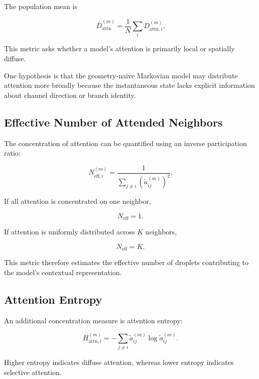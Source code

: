 \documentclass[11pt]{article}
\begin{document}
The population mean is

\begin{equation}
\bar{D}_{\mathrm{attn}}^{(m)}
=
\frac{1}{N}
\sum_i
D_{\mathrm{attn},i}^{(m)}.
\end{equation}

This metric asks whether a model's attention is primarily local or spatially diffuse.

One hypothesis is that the geometry-naive Markovian model may distribute attention more broadly because the instantaneous state lacks explicit information about channel direction or branch identity.

\subsection{Effective Number of Attended Neighbors}

The concentration of attention can be quantified using an inverse participation ratio:

\begin{equation}
N_{\mathrm{eff},i}^{(m)}
=
\frac{
1
}{
\sum_{j\neq i}
\left(
\tilde{a}_{ij}^{(m)}
\right)^2
}.
\end{equation}

If all attention is concentrated on one neighbor,

\begin{equation}
N_{\mathrm{eff}}=1.
\end{equation}

If attention is uniformly distributed across \(K\) neighbors,

\begin{equation}
N_{\mathrm{eff}}=K.
\end{equation}

This metric therefore estimates the effective number of droplets contributing to the model's contextual representation.

\subsection{Attention Entropy}

An additional concentration measure is attention entropy:

\begin{equation}
H_{\mathrm{attn},i}^{(m)}
=
-
\sum_{j\neq i}
\tilde{a}_{ij}^{(m)}
\log
\tilde{a}_{ij}^{(m)}.
\end{equation}

Higher entropy indicates diffuse attention, whereas lower entropy indicates selective attention.
\end{document}
